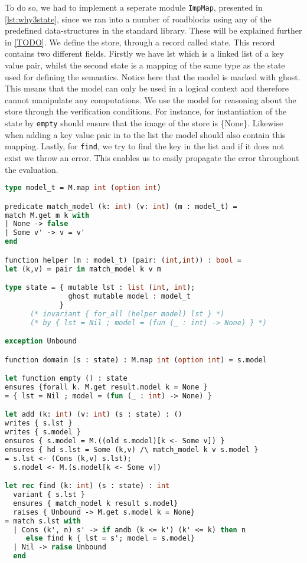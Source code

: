 To do so, we had to implement a seperate module \texttt{ImpMap}, presented in \autoref{lst:why3state},
since we ran into a number of roadblocks using any of the predefined data-structures in the standard library.
These will be explained further in \autoref{TODO}.
We define the store, through a record called state.
This record contains two different fields.
Firstly we have lst which is a linked list of a key value pair,
whilst the second state is a mapping of the same type as the state used for defining the semantics.
Notice here that the model is marked with ghost. This means that the model can only be used in a logical context
and therefore cannot manipulate any computations.
We use the model for reasoning about the store through the verification conditions.
For instance, for instantiation of the state by \texttt{empty} should ensure that the image of the store is \{None\}.
Likewise when adding a key value pair in to the list the model should also contain this mapping.
Lastly, for \texttt{find}, we try to find the key in the list and if it does not exist we throw an error.
This enables us to easily propagate the error throughout the evaluation.

\begin{lstlisting}[caption={Model for a store},label={lst:why3state},language=sml]
type model_t = M.map int (option int)

predicate match_model (k: int) (v: int) (m : model_t) =
match M.get m k with
| None -> false
| Some v' -> v = v'
end

function helper (m : model_t) (pair: (int,int)) : bool =
let (k,v) = pair in match_model k v m

type state = { mutable lst : list (int, int);
               ghost mutable model : model_t
             }
      (* invariant { for_all (helper model) lst } *)
      (* by { lst = Nil ; model = (fun (_ : int) -> None) } *)

exception Unbound

function domain (s : state) : M.map int (option int) = s.model

let function empty () : state
ensures {forall k. M.get result.model k = None }
= { lst = Nil ; model = (fun (_ : int) -> None) }

let add (k: int) (v: int) (s : state) : ()
writes { s.lst }
writes { s.model }
ensures { s.model = M.((old s.model)[k <- Some v]) }
ensures { hd s.lst = Some (k,v) /\ match_model k v s.model }
= s.lst <- (Cons (k,v) s.lst);
  s.model <- M.(s.model[k <- Some v])

let rec find (k: int) (s : state) : int
  variant { s.lst }
  ensures { match_model k result s.model}
  raises { Unbound -> M.get s.model k = None}
= match s.lst with
  | Cons (k', n) s' -> if andb (k <= k') (k' <= k) then n
     else find k { lst = s'; model = s.model}
  | Nil -> raise Unbound
  end
\end{lstlisting}